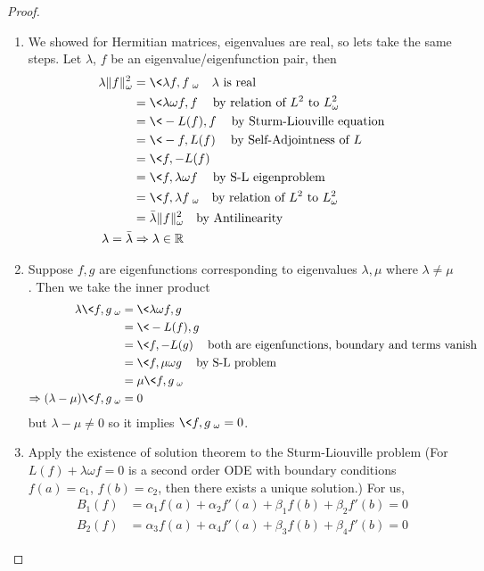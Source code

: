 \begin{proof}
\begin{enumerate}
\item We showed for Hermitian matrices, eigenvalues are
  real, so lets take the same steps. Let $\lambda$, $f$ be
  an eigenvalue/eigenfunction pair, then
\begin{align*}
\lambda\|f\|^{2}_{\omega} &= \<\lambda
f,f\>_{\omega}\quad\text{$\lambda$ is real}\\
&=\<\lambda\omega f,f\>\quad\text{by relation of $L^2$ to $L^{2}_{\omega}$}\\
&=\<-L(f),f\>\quad\text{by Sturm-Liouville equation}\\
&=\<-f,L(f)\>\quad\text{by Self-Adjointness of $L$}\\
&=\<f,-L(f)\>\\
&=\<f,\lambda\omega f\>\quad\text{by S-L eigenproblem}\\
&=\<f,\lambda f\>_{\omega}\quad\text{by relation of $L^2$ to $L^{2}_{\omega}$}\\
&=\bar{\lambda}\|f\|^{2}_{\omega}\quad\text{by Antilinearity}\\
\lambda=\bar{\lambda}&\Rightarrow\lambda\in\mathbb{R}
\end{align*}
\item Suppose $f,g$ are eigenfunctions corresponding to
  eigenvalues $\lambda,\mu$ where $\lambda\neq\mu$. Then we
  take the inner product
\begin{align*}
\lambda\<f,g\>_{\omega} &= \<\lambda\omega f,g\> \\
&= \<-L(f),g\>\\
&= \<f,-L(g)\>\quad\text{both are eigenfunctions, boundary and terms vanish}\\
&= \<f,\mu\omega g\>\quad\text{by S-L problem}\\
&= \mu\<f,g\>_{\omega}\\
\Rightarrow (\lambda-\mu)\<f,g\>_{\omega} &=0
\end{align*}
but $\lambda-\mu\neq0$ so it implies $\<f,g\>_{\omega}=0$.
\item Apply the existence of solution theorem to the
  Sturm-Liouville problem (For $L(f)+\lambda\omega f=0$ is a
  second order ODE with boundary conditions $f(a)=c_1$,
  $f(b)=c_2$, then there exists a unique solution.) For us,
\begin{align*}
B_{1}(f) &= \alpha_{1}f(a) + \alpha_{2}f'(a) +\beta_{1}f(b)+\beta_{2}f'(b)=0\\
B_{2}(f) &= \alpha_{3}f(a) + \alpha_{4}f'(a) +\beta_{3}f(b)+\beta_{4}f'(b)=0

\end{align*}
\end{enumerate}
\end{proof}
